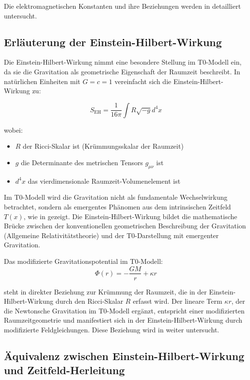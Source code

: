 \documentclass[12pt,a4paper]{article}
\begin{document}
Die elektromagnetischen Konstanten und ihre Beziehungen werden in \cite{pascher_alpha_2025} detailliert untersucht.

\subsection*{Erläuterung der Einstein-Hilbert-Wirkung}

Die Einstein-Hilbert-Wirkung nimmt eine besondere Stellung im T0-Modell ein, da sie die Gravitation als geometrische Eigenschaft der Raumzeit beschreibt. In natürlichen Einheiten mit $G = c = 1$ vereinfacht sich die Einstein-Hilbert-Wirkung zu:

\[
S_{\mathrm{EH}} = \frac{1}{16\pi}\int R\sqrt{-g}d^4x
\]

wobei:
\begin{itemize}
	\item $R$ der Ricci-Skalar ist (Krümmungsskalar der Raumzeit)
	\item $g$ die Determinante des metrischen Tensors $g_{\mu\nu}$ ist
	\item $d^4x$ das vierdimensionale Raumzeit-Volumenelement ist
\end{itemize}

Im T0-Modell wird die Gravitation nicht als fundamentale Wechselwirkung betrachtet, sondern als emergentes Phänomen aus dem intrinsischen Zeitfeld $T(x)$, wie in \cite{pascher_emergente_gravitation_2025} gezeigt. Die Einstein-Hilbert-Wirkung bildet die mathematische Brücke zwischen der konventionellen geometrischen Beschreibung der Gravitation (Allgemeine Relativitätstheorie) und der T0-Darstellung mit emergenter Gravitation.

Das modifizierte Gravitationspotential im T0-Modell:
\[
\Phi(r) = -\frac{GM}{r} + \kappa r
\]

steht in direkter Beziehung zur Krümmung der Raumzeit, die in der Einstein-Hilbert-Wirkung durch den Ricci-Skalar $R$ erfasst wird. Der lineare Term $\kappa r$, der die Newtonsche Gravitation im T0-Modell ergänzt, entspricht einer modifizierten Raumzeitgeometrie und manifestiert sich in der Einstein-Hilbert-Wirkung durch modifizierte Feldgleichungen. Diese Beziehung wird in \cite{pascher_galaxies_2025} weiter untersucht.

\subsection*{Äquivalenz zwischen Einstein-Hilbert-Wirkung und Zeitfeld-Herleitung}
\end{document}
